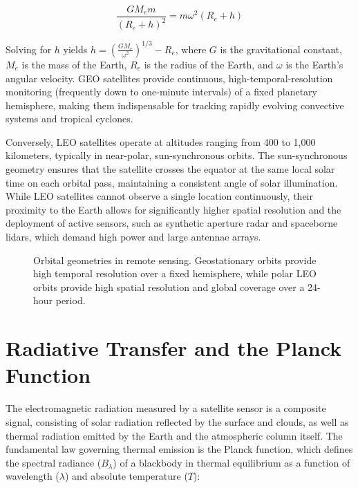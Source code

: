 \begin{equation}
\frac{G M_e m}{(R_e + h)^2} = m \omega^2 (R_e + h) 
\end{equation}

Solving for $h$ yields $h = \left( \frac{G M_e}{\omega^2} \right)^{1/3} - R_e$, where $G$ is the gravitational constant, $M_e$ is the mass of the Earth, $R_e$ is the radius of the Earth, and $\omega$ is the Earth's angular velocity. GEO satellites provide continuous, high-temporal-resolution monitoring (frequently down to one-minute intervals) of a fixed planetary hemisphere, making them indispensable for tracking rapidly evolving convective systems and tropical cyclones.

Conversely, LEO satellites operate at altitudes ranging from 400 to 1,000 kilometers, typically in near-polar, sun-synchronous orbits. The sun-synchronous geometry ensures that the satellite crosses the equator at the same local solar time on each orbital pass, maintaining a consistent angle of solar illumination. While LEO satellites cannot observe a single location continuously, their proximity to the Earth allows for significantly higher spatial resolution and the deployment of active sensors, such as synthetic aperture radar and spaceborne lidars, which demand high power and large antennae arrays.

\begin{figure}[H]
    \centering
    \caption{Orbital geometries in remote sensing. Geostationary orbits provide high temporal resolution over a fixed hemisphere, while polar LEO orbits provide high spatial resolution and global coverage over a 24-hour period.}
    \label{fig:orbit_comparison}
\end{figure}

\section{Radiative Transfer and the Planck Function}

The electromagnetic radiation measured by a satellite sensor is a composite signal, consisting of solar radiation reflected by the surface and clouds, as well as thermal radiation emitted by the Earth and the atmospheric column itself. The fundamental law governing thermal emission is the Planck function, which defines the spectral radiance ($B_\lambda$) of a blackbody in thermal equilibrium as a function of wavelength ($\lambda$) and absolute temperature ($T$):

